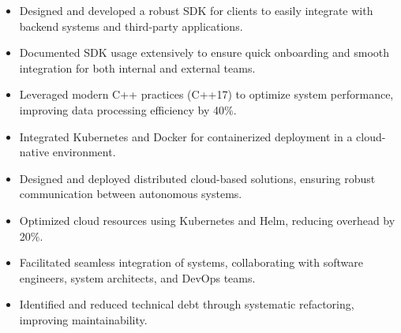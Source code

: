 \par\smallskip
\noindent
\begin{minipage}{20cm}
  \begin{minipage}{9.75cm}
    \begin{itemize}
      \item Designed and developed a robust SDK for clients to easily integrate with backend systems and third-party applications.
      \item Documented SDK usage extensively to ensure quick onboarding and smooth integration for both internal and external teams.
    \end{itemize}
  \end{minipage}
  \hfill
  \begin{minipage}{9.75cm}
    \begin{itemize}
      \item Leveraged modern C++ practices (C++17) to optimize system performance, improving data processing efficiency by 40\%.
      \item Integrated Kubernetes and Docker for containerized deployment in a cloud-native environment.
    \end{itemize}
  \end{minipage}
\end{minipage}
\par\smallskip
\divider

\par\smallskip
\noindent
\begin{minipage}{20cm}
  \begin{minipage}{9.75cm}
    \begin{itemize}
      \item Designed and deployed distributed cloud-based solutions, ensuring robust communication between autonomous systems.
      \item Optimized cloud resources using Kubernetes and Helm, reducing overhead by 20\%.
    \end{itemize}
  \end{minipage}
  \hfill
  \begin{minipage}{9.75cm}
    \begin{itemize}
      \item Facilitated seamless integration of systems, collaborating with software engineers, system architects, and DevOps teams.
      \item Identified and reduced technical debt through systematic refactoring, improving maintainability.
    \end{itemize}
  \end{minipage}
\end{minipage}

